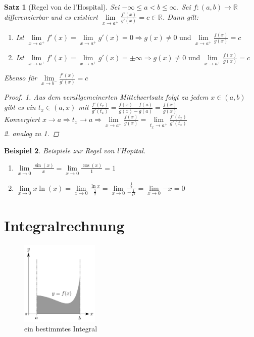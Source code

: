 \documentclass[a4paper,titlepage,oneside]{article}
\def\R{\ensuremath{\mathbb{R}} }
\newcommand{\limnull}[2][n]{\ensuremath{\lim\limits_{#1 \rightarrow 0}{#2}}}
\newcommand{\limpos}[3][n]{\ensuremath{\lim\limits_{#1 \rightarrow #2^+}{#3}}}
\newcommand{\limneg}[3][n]{\ensuremath{\lim\limits_{#1 \rightarrow #2^-}{#3}}}
\theoremstyle{thmstyle}
\newtheorem{satz}{Satz}[section]
\newtheorem{bsp}[satz]{Beispiel}
\theoremstyle{subthmstyle}
\begin{document}
\begin{satz}[Regel von de l'Hospital]
Sei $-\infty \le a < b \le \infty$. Sei $f : (a,b) \to \R $ differenzierbar und es existiert $ \displaystyle \limpos[x]{a}{\frac{f'(x)}{g'(x)}} = c \in \R$.
Dann gilt:
\begin{enumerate}
\item Ist $ \displaystyle \limpos[x]{a}{f'(x)} = \limpos[x]{a}{g'(x)} = 0 \Rightarrow g(x) \ne 0 \text{ und } \limpos[x]{a}{\frac{f(x)}{g(x)}} = c$
\item Ist $ \displaystyle \limpos[x]{a}{f'(x)} = \limpos[x]{a}{g'(x)} = \pm \infty \Rightarrow g(x) \ne 0 \text{ und } \limpos[x]{a}{\frac{f(x)}{g(x)}} = c$
\end{enumerate}
Ebenso für $ \displaystyle \limneg[x]{b}{\frac{f'(x)}{g'(x)}} = c$
\begin{proof}
1. Aus dem verallgemeinerten Mittelwertsatz folgt zu jedem $x \in (a,b)$ gibt es ein $t_x \in (a,x)$ mit $ \displaystyle \frac{f'(t_x)}{g'(t_x)} = \frac{f(x) - f(a)}{g(x) - g(a)} = \frac{f(x)}{g(x)}$\\
Konvergiert $x \to a \Rightarrow  t_x \to a \displaystyle \Rightarrow \limpos[x]{a}{\frac{f(x)}{g(x)}} = \limpos[t_x]{a}{\frac{f'(t_x)}{g'(t_x)}}$\\
2. analog zu 1.
\end{proof}
\end{satz}

\begin{bsp}
Beispiele zur Regel von l'Hopital.
\begin{enumerate}
\item $ \displaystyle  \limnull[x]{\frac{\sin(x)}{x}} = \limnull[x]{\frac{\cos(x)}{1}} = 1$
\item $ \displaystyle  \limnull[x]{x \ln(x)} = \limnull[x]{\frac{\ln x}{\frac{1}{x}}} = \limnull[x]{\frac{\frac{1}{x}}{-\frac{1}{x^2}}} = \limnull[x]{-x} = 0$
\end{enumerate}
\end{bsp}


\section{Integralrechnung}
\begin{figure}[ht]\centering
 \includegraphics[width=0.33\textwidth]{images/Integral.png}
\caption{ein bestimmtes Integral}
\end{figure}
\end{document}
